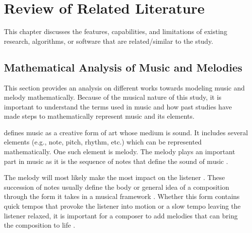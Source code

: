 %
%
%                 

\chapter{Review of Related Literature}
\label{sec:relatedlit}
\begin{comment}
then for team MusicG my suggested columns would be 
2.1 Authors | Focus (if melody, chord, progression, sequence) | Model (what math formula or name did they use no need to put formula sa table) 
2.2 Authors | Name of Tool | Platform | Input Type | Algorithm (what they used to generate sequences)
2.3 Authors | Name of Tool | How many testers | Comments  and other  reported findings
\end{comment}

This chapter discusses the features, capabilities, and limitations of existing research, algorithms, or software that are related/similar to the study.

\section{Mathematical Analysis of Music and Melodies}
This section provides an analysis on different works towards modeling music and melody mathematically. Because of the musical nature of this study, it is important to understand the terms used in music and how past studies have made steps to mathematically represent music and its elements.

\citet{loy2011musimathics} defines music as a creative form of art whose medium is sound. It includes several elements (e.g., note, pitch, rhythm, etc.) which can be represented mathematically. One such element is melody. The melody plays an important part in music \citep{unehara2001composition,unehara2005music} as it is the sequence of notes that define the sound of music \citep{ryynanen2008automatic}. 

The melody will most likely make the most impact on the listener \citep{jarret2008music}. These succession of notes usually define the body or general idea of a composition through the form it takes in a musical framework \citep{jarret2008music}. Whether this form contains quick tempos that provoke the listener into motion or a slow tempo leaving the listener relaxed, it is important for a composer to add melodies that can bring the composition to life \citep{jarret2008music}. 

